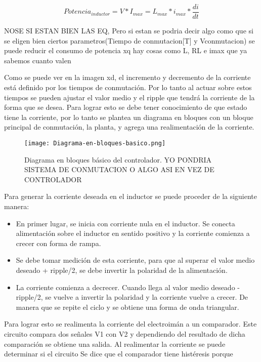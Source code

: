 \begin{equation}
Potencia_{inductor} = V*I_{max}=L_{max}*i_{max}*\frac{di}{dt}
\end{equation}

NOSE SI ESTAN BIEN LAS EQ, Pero si estan se podria decir algo como que si se eligen bien ciertos parametros(Tiempo de conmutacion[T] y Vconmutacion) se puede reducir el consumo de potencia xq hay cosas como L, RL e imax que ya sabemos cuanto valen

Como se puede ver en la imagen xd, el incremento y decremento de la corriente está definido por los tiempos de conmutación. Por lo tanto al actuar sobre estos tiempos se pueden ajustar el valor medio y el ripple que tendrá la corriente de la forma que se desea. Para lograr esto se debe tener conocimiento de que estado tiene la corriente, por lo tanto se plantea un diagrama en bloques con un bloque principal de conmutación, la planta, y agrega una realimentación de la corriente.

\begin{figure}[H]
	\centering
	\texttt{[image: Diagrama-en-bloques-basico.png]}
	\caption{Diagrama en bloques básico del controlador. YO PONDRIA SISTEMA DE CONMUTACION O ALGO ASI EN VEZ DE CONTROLADOR}
	\label{fig:img_diagrama_bloques_basico}
\end{figure}

Para generar la corriente deseada en el inductor se puede proceder de la siguiente manera:

\begin{itemize}
\item En primer lugar, se inicia con corriente nula en el inductor. Se conecta alimentación sobre el inductor en sentido positivo y la corriente comienza a crecer con forma de rampa.
\item Se debe tomar medición de esta corriente, para que al superar el valor medio deseado + ripple/2, se debe invertir la polaridad de la alimentación.
\item La corriente comienza a decrecer. Cuando llega al valor medio deseado - ripple/2, se vuelve a invertir la polaridad y la corriente vuelve a crecer. De manera que se repite el ciclo y se obtiene una forma de onda triangular.
\end{itemize}

Para lograr esto se realimenta la corriente del electroimán a un comparador. Este circuito compara dos señales V1 con V2 y dependiendo del resultado de dicha comparación se obtiene una salida. Al realimentar la corriente se puede determinar si el circuito 
Se dice que el comparador tiene histéresis porque



